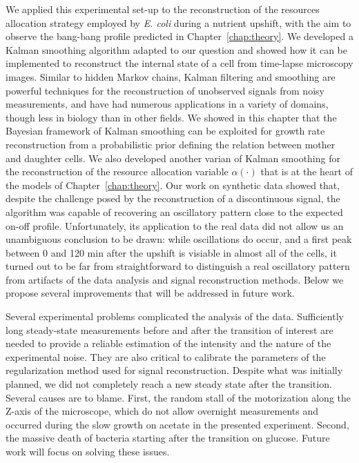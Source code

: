We applied this experimental set-up to the reconstruction of the resources allocation strategy employed by \textit{E. coli} during a nutrient upshift, with the aim to observe the bang-bang profile predicted in Chapter~\ref{chap:theory}.
We developed a Kalman smoothing algorithm adapted to our question and showed how it can be implemented to reconstruct the internal state of a cell from time-lapse microscopy images.
Similar to hidden Markov chains, Kalman filtering and smoothing are powerful techniques for the reconstruction of unobserved signals from noisy measurements, and have had numerous applications in a variety of domains, though less in biology than in other fields.
We showed in this chapter that the Bayesian framework of Kalman smoothing can be exploited for growth rate reconstruction from a probabilistic prior defining the relation between mother and daughter cells.
We also developed another varian of Kalman smoothing for the reconstruction of the resource allocation variable $\alpha (\cdot)$ that is at the heart of the models of Chapter~\ref{chap:theory}.
Our work on synthetic data showed that, despite the challenge posed by the reconstruction of a discontinuous signal, the algorithm was capable of recovering an oscillatory pattern close to the expected on-off profile.
Unfortunately, its application to the real data did not allow us an unambiguous conclusion to be drawn: while oscillations do occur, and a first peak between 0 and 120 min after the upshift is visiable in almost all of the cells, it turned out to be far from straightforward to distinguish a real oscillatory pattern from artifacts of the data analysis and signal reconstruction methods.
Below we propose several improvements that will be addressed in future work.

Several experimental problems complicated the analysis of the data.
Sufficiently long steady-state measurements before and after the transition of interest are needed to provide a reliable estimation of the intensity and the nature of the experimental noise.
They are also critical to calibrate the parameters of the regularization method used for signal reconstruction.
Despite what was initially planned, we did not completely reach a new steady state after the transition.
Several causes are to blame.
First, the random stall of the motorization along the Z-axis of the microscope, which do not allow overnight measurements and occurred during the slow growth on acetate in the presented experiment.
Second, the massive death of bacteria starting after the transition on glucose.
Future work will focus on solving these issues.

